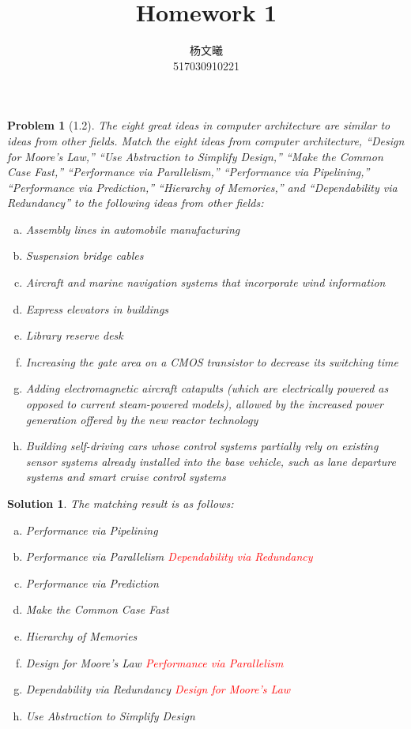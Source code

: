 \documentclass[12pt]{article}
\newtheorem{problem}{Problem}[]
\newtheorem*{solution}{Solution}
\begin{document}
  \title{\textbf{Homework 1}}
    \author{杨文曦\\
      517030910221}
    \maketitle

    \begin{problem}[1.2]
      The eight great ideas in computer architecture are similar to ideas from other fields. Match the eight ideas from computer architecture, “Design for Moore’s Law,” “Use Abstraction to Simplify Design,” “Make the Common Case Fast,” “Performance via Parallelism,” “Performance via Pipelining,” “Performance via Prediction,” “Hierarchy of Memories,” and “Dependability via Redundancy” to the following ideas from other fields:
      \begin{enumerate}[a.]
        \item Assembly lines in automobile manufacturing
        \item Suspension bridge cables
        \item Aircraft and marine navigation systems that incorporate wind information
        \item Express elevators in buildings
        \item Library reserve desk
        \item Increasing the gate area on a CMOS transistor to decrease its switching time
        \item Adding electromagnetic aircraft catapults (which are electrically powered as opposed to current steam-powered models), allowed by the increased power generation offered by the new reactor  technology
        \item Building self-driving cars whose control systems partially rely on existing sensor systems already installed into the base vehicle, such as lane departure systems and smart cruise control systems
      \end{enumerate}
    \end{problem}

    \begin{solution}
      The matching result is as follows:
      \begin{enumerate}[a.]
        \item Performance via Pipelining
        \item Performance via Parallelism \textcolor{red}{Dependability via Redundancy}
        \item Performance via Prediction
        \item Make the Common Case Fast
        \item Hierarchy of Memories
        \item Design for Moore’s Law \textcolor{red}{Performance via Parallelism}
        \item Dependability via Redundancy \textcolor{red}{Design for Moore’s Law}
        \item Use Abstraction to Simplify Design
      \end{enumerate}
    \end{solution}
\end{document}
